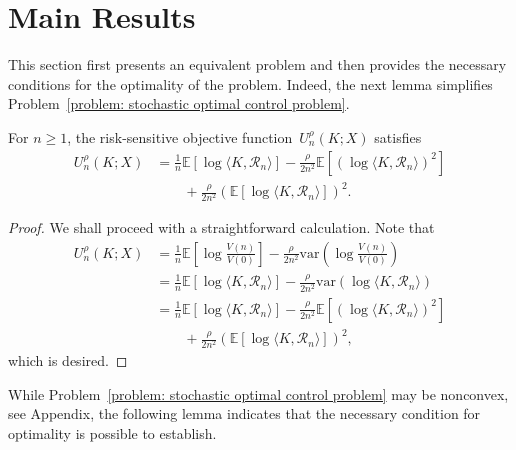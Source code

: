 \section{Main Results}\label{section: main results}
This section first presents an equivalent problem and then provides the necessary conditions for the optimality of the problem.
 Indeed, the next lemma simplifies Problem~\eqref{problem: stochastic optimal control problem}.

\begin{lemma} \label{lemma: equivalent risk-sensitive problem}
For $n\geq 1$,
    the risk-sensitive objective function~$U_n^\rho(K; X)$   satisfies
    \begin{align*}
	{U_n^\rho}(K; X) 
	&= \frac{1}{n}\mathbb{E}\left[ \log \langle K, \mathcal{R}_n \rangle  \right] - \frac{\rho}{2n^2}\mathbb{E}\left[ \left( \log\langle K, \mathcal{R}_n \rangle  \right)^2 \right] \\
	&\qquad + \frac{\rho}{2n^2}\left( \mathbb{E}\left[ \log\langle K, \mathcal{R}_n \rangle  \right] \right)^2.
\end{align*} 
\end{lemma}

\begin{proof}
We shall proceed with a straightforward calculation.
Note that
    \begin{align*}
	{U_n^\rho}(K; X) 
	&= \frac{1}{n} \mathbb{E}\left[ \log \frac{V(n)}{V(0)} \right] - \frac{\rho}{2n^2}\text{var}\left( \log \frac{V(n)}{V(0)} \right)  \\
	&= \frac{1}{n}\mathbb{E}\left[ \log \langle K, \mathcal{R}_n \rangle \right] - \frac{\rho}{2n^2}\text{var}\left( \log \langle K, \mathcal{R}_n \rangle \right) \\
	&= \frac{1}{n}\mathbb{E}\left[ \log \langle K, \mathcal{R}_n \rangle \right] - \frac{\rho}{2n^2}\mathbb{E}\left[ \left( \log \langle K, \mathcal{R}_n \rangle \right)^2 \right] \\
	&\qquad + \frac{\rho}{2n^2}\left( \mathbb{E}\left[ \log \langle K, \mathcal{R}_n \rangle \right] \right)^2,
\end{align*}
which is desired.
\end{proof}


 


While Problem~\eqref{problem: stochastic optimal control problem} may be nonconvex, see Appendix, the following lemma indicates that the necessary condition for optimality is possible to establish.



